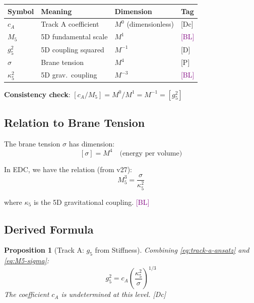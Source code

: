 \documentclass[11pt,a4paper]{article}
\newtheorem{proposition}[theorem]{Proposition}
\newcommand{\tagD}{\textcolor{blue!70!black}{[D]}}
\newcommand{\tagDc}{\textcolor{blue!50!black}{[Dc]}}
\newcommand{\tagP}{\textcolor{green!50!black}{[P]}}
\newcommand{\tagBL}{\textcolor{purple}{[BL]}}
\begin{document}
\begin{resultbox}
\begin{center}
\begin{tabular}{llll}
\toprule
\textbf{Symbol} & \textbf{Meaning} & \textbf{Dimension} & \textbf{Tag} \\
\midrule
$c_A$ & Track A coefficient & $M^0$ (dimensionless) & \tagDc \\
$M_5$ & 5D fundamental scale & $M^1$ & \tagBL \\
$g_5^2$ & 5D coupling squared & $M^{-1}$ & \tagD \\
$\sigma$ & Brane tension & $M^4$ & \tagP \\
$\kappa_5^2$ & 5D grav.\ coupling & $M^{-3}$ & \tagBL \\
\bottomrule
\end{tabular}
\end{center}
\textbf{Consistency check}: $[c_A/M_5] = M^0/M^1 = M^{-1} = [g_5^2]$ \checkmark
\end{resultbox}

\subsection{Relation to Brane Tension}

The brane tension $\sigma$ has dimension:
\begin{equation}
\label{eq:sigma-dim}
[\sigma] = M^4 \quad \text{(energy per volume)}
\end{equation}

In EDC, we have the relation (from v27):
\begin{equation}
\label{eq:M5-sigma}
M_5^3 = \frac{\sigma}{\kappa_5^2}
\end{equation}

where $\kappa_5$ is the 5D gravitational coupling. \tagBL

\subsection{Derived Formula}

\begin{proposition}[Track A: $g_5$ from Stiffness]
\label{prop:track-a-formula}
Combining \eqref{eq:track-a-ansatz} and \eqref{eq:M5-sigma}:
\begin{equation}
\label{eq:track-a-g5}
\boxed{g_5^2 = c_A \left(\frac{\kappa_5^2}{\sigma}\right)^{1/3}}
\end{equation}
The coefficient $c_A$ is undetermined at this level. \tagDc
\end{proposition}
\end{document}
